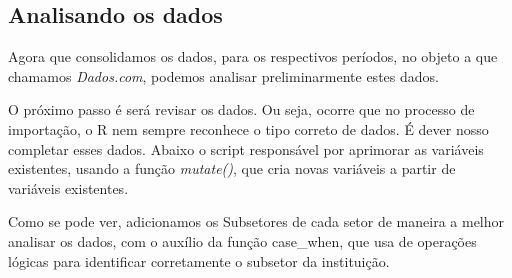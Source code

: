 \documentclass[
]{article}
\begin{document}
\hypertarget{analisando-os-dados}{%
\subsection{Analisando os dados}\label{analisando-os-dados}}

Agora que consolidamos os dados, para os respectivos períodos, no objeto
a que chamamos \emph{Dados.com}, podemos analisar preliminarmente estes
dados.

O próximo passo é será revisar os dados. Ou seja, ocorre que no processo
de importação, o R nem sempre reconhece o tipo correto de dados. É dever
nosso completar esses dados. Abaixo o script responsável por aprimorar
as variáveis existentes, usando a função \emph{mutate()}, que cria novas
variáveis a partir de variáveis existentes.

Como se pode ver, adicionamos os Subsetores de cada setor de maneira a
melhor analisar os dados, com o auxílio da função case\_when, que usa de
operações lógicas para identificar corretamente o subsetor da
instituição.
\end{document}
